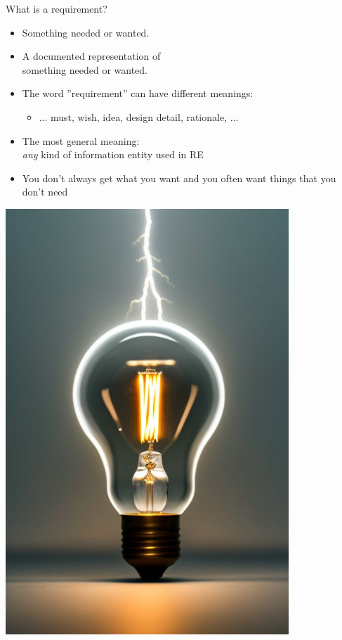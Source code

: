 \documentclass{simpleslides}
\begin{document}
\begin{frame}[fragile]{What is a requirement?}
\begin{minipage}[t]{0.6\textwidth}
\vspace{0pt}
\begin{itemize}
\item Something needed or wanted.
\item A documented representation of \\something needed or wanted.
\item The word ''requirement'' can have different meanings:
\begin{itemize}
\item ... must, wish, idea, design detail, rationale, ...
\end{itemize}
\item The most general meaning:\\
\emph{any} kind of information entity used in RE
\item You don't always get what you want and you often want things that you don't need
\end{itemize}
\end{minipage}%
\begin{minipage}[t]{0.4\textwidth}
  \vspace{0pt}
  \hfill
\includegraphics[width=0.8\textwidth]{img/light-bulb3}
\end{minipage}%
\end{frame}
\end{document}
